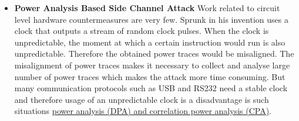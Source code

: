 \begin{itemize}
    \item  \textbf{Power Analysis Based Side Channel Attack} 
    Work related to circuit level hardware countermeasures are very few. 
    Sprunk in his invention uses a clock that outputs a stream of random clock pulses. 
    When the clock is unpredictable, the moment at which a certain instruction would run is also unpredictable. 
    Therefore the obtained power traces would be misaligned. The misalignment of power traces makes it necessary
    to collect and analyse large number of power traces which makes the attack more time consuming. 
    But many communication protocols such as USB and RS232 need a stable clock and
    therefore usage of an unpredictable clock is a disadvantage is such situations
    \href{https://arxiv.org/pdf/1801.00932.pdf}{power analysis (DPA) and correlation power analysis (CPA)}.

    \end{itemize}